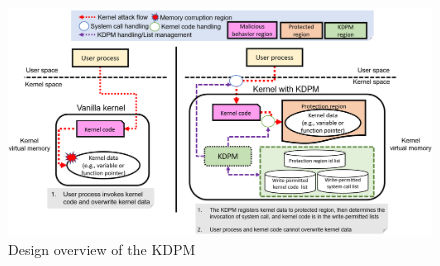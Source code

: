 \begin{figure}[tb]
  \hspace{10.0ex}
  \includegraphics[bb=0 0 1430 762, scale=.320]{./imgs/003_screenshot_2021-07-27_19.37.39.png}
  \caption{
    Design overview of the KDPM
  }
 \label{fig:design_overview}
\end{figure}


